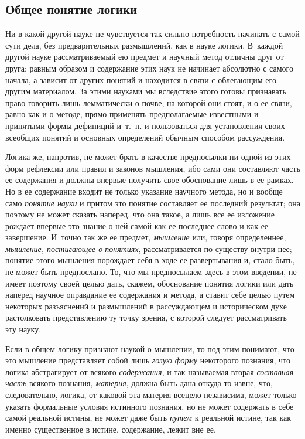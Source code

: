 \subsection[Общее понятие логики]{Общее понятие логики}
Ни в какой другой науке не чувствуется так
сильно потребность начинать с самой сути дела, без предварительных
размышлений, как в науке логики. В~каждой другой науке рассматриваемый ею
предмет и научный метод отличны друг от друга; равным образом и содержание
этих наук не начинает абсолютно с самого начала, а зависит от других
понятий и находится в связи с облегающим его другим материалом. За этими
науками мы вследствие этого готовы признавать право говорить лишь
лемматически о почве, на которой они стоят, и о ее связи, равно как и о
методе, прямо применять предполагаемые известными и
принятыми формы дефиниций и~т.~п. и пользоваться для установления своих
всеобщих понятий и основных определений обычным способом рассуждения.

Логика же, напротив, не может брать в качестве предпосылки ни одной из этих
форм рефлексии или правил и законов мышления, ибо сами они составляют часть
ее содержания и должны впервые получить свое обоснование лишь в ее рамках.
Но в ее содержание входит не только указание научного метода, но и вообще
само {\em понятие науки} и притом это понятие
составляет ее последний результат; она поэтому не может сказать наперед,
что она такое, а лишь все ее изложение рождает впервые это знание о ней
самой как ее последнее слово и как ее завершение. И~точно так же ее
предмет, {\em мышление} или, говоря определеннее,
{\em мышление, постигающее в понятиях}, рассматривается
по существу внутри нее; понятие этого мышления порождает себя в ходе ее
развертывания и, стало быть, не может быть предпослано. То, что мы
предпосылаем здесь в этом введении, не имеет поэтому своей целью дать,
скажем, обоснование понятия логики или дать наперед научное оправдание ее
содержания и метода, а ставит себе целью путем некоторых разъяснений и
размышлений в рассуждающем и историческом духе растолковать представлению
ту точку зрения, с которой следует рассматривать эту науку.

Если в общем логику признают наукой о мышлении, то под этим понимают, что
это мышление представляет собой лишь {\em голую форму}
некоторого познания, что логика абстрагирует от всякого
{\em содержания}, и так называемая вторая
{\em составная часть} всякого познания,
{\em материя}, должна быть дана откуда-то извне, что,
следовательно, логика, от каковой эта материя всецело независима, может
только указать формальные условия истинного познания, но не может содержать
в себе самой реальной истины, не может даже быть
{\em путем} к реальной истине, так как именно
существенное в истине, содержание, лежит вне ее.

